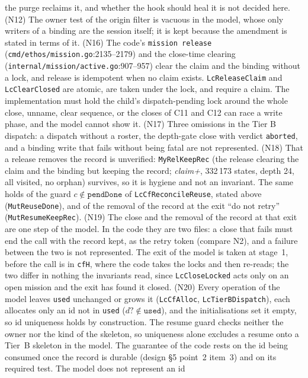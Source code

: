 \documentclass[a4paper,10pt,fleqn]{article}
\newcommand{\fpath}[1]{\texttt{#1}}
\newcommand{\field}[1]{\texttt{#1}}
\begin{document}
the purge reclaims it, and whether the hook should heal it is not decided
here. (N12) The owner test of the origin filter is vacuous in the model,
whose only writers of a binding are the session itself; it is kept because
the amendment is stated in terms of it.
(N16) The code's \field{mission release}
(\fpath{cmd/ethos/mission.go}:2135--2179) and the close-time clearing
(\fpath{internal/mission/active.go}:907--957) clear the claim and the binding
without a lock, and release is idempotent when no claim exists.
\field{LcReleaseClaim} and \field{LcClearClosed} are atomic, are taken under
the lock, and require a claim. The implementation must hold the child's
dispatch-pending lock around the whole close, unname, clear sequence, or the
closes of C11 and C12 can race a write phase, and the model cannot show it.
(N17) Three omissions in the Tier B dispatch: a dispatch without a roster, the
depth-gate close with verdict \field{aborted}, and a binding write that fails
without being fatal are not represented. (N18) That a release removes the
record is unverified: \texttt{MyRelKeepRec} (the release clearing the claim and the binding but keeping the record; \emph{claim+}, 332\,173 states, depth 24, all visited, no orphan) survives, so it is hygiene and not
an invariant. The same holds of the guard $c\notin\field{pendDone}$ of
\field{LcCfReconcileReuse}, stated above (\texttt{MutReuseDone}), and of the
removal of the record at the exit ``do not retry'' (\texttt{MutResumeKeepRec}).
(N19) The close and the removal of the record at that exit are one step of the
model. In the code they are two files: a close that fails must end the call
with the record kept, as the retry token (compare N2), and a failure between
the two is not represented. The exit of the model is taken at stage~1, before
the call is in \field{cfH}, where the code takes the locks and then re-reads;
the two differ in nothing the invariants read, since \field{LcCloseLocked}
acts only on an open mission and the exit has found it closed.
(N20) Every operation of the model leaves \field{used} unchanged or grows it
(\field{LcCfAlloc}, \field{LcTierBDispatch}), each allocates only an id not in
\field{used} ($d?\notin\field{used}$), and the initialisations set it empty, so id uniqueness holds by construction. The resume guard
checks neither the owner nor the kind of the skeleton, so uniqueness alone
excludes a resume onto a Tier~B skeleton in the model. The guarantee of the
code rests on the id being consumed once the record is durable (design \S5
point~2 item~3) and on its required test. The model does not represent an id
\end{document}
